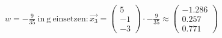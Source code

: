 \documentclass[preview]{standalone}
\begin{document}
\begin{center}
$w = -\frac{9}{35} \: \mathrm{in \: g \: einsetzen:} \vec{x_3} = \begin{pmatrix} 5 \\ -1 \\ -3 \end{pmatrix} \cdot -\frac{9}{35} \approx \begin{pmatrix} -1.286 \\ 0.257 \\ 0.771 \end{pmatrix}$
\end{center}
\end{document}
